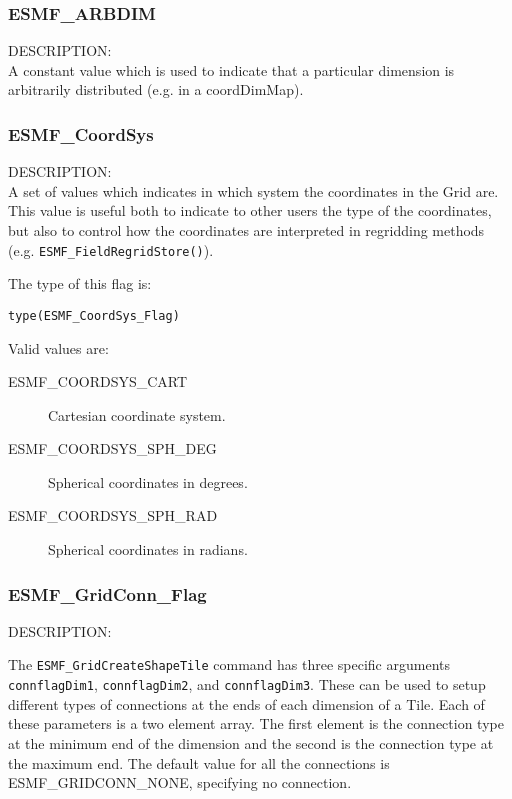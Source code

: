 
\subsubsection{ESMF\_ARBDIM}
\label{sec:opt:arbdim}

{\sf DESCRIPTION:\\}
A constant value which is used to indicate that a particular dimension is arbitrarily distributed (e.g. in a coordDimMap). 

\subsubsection{ESMF\_CoordSys}
\label{sec:opt:coordsys}

{\sf DESCRIPTION:\\}
 A set of values which indicates in which system the coordinates in the Grid are. This value is useful both to indicate to 
other users the type of the coordinates, but also to control how the coordinates are interpreted in regridding methods 
(e.g. {\tt ESMF\_FieldRegridStore()}).

The type of this flag is:

{\tt type(ESMF\_CoordSys\_Flag)}

Valid values are:
\begin{description}
\item [ESMF\_COORDSYS\_CART] Cartesian coordinate system. 

\item [ESMF\_COORDSYS\_SPH\_DEG] Spherical coordinates in degrees.

\item [ESMF\_COORDSYS\_SPH\_RAD] Spherical coordinates in radians.
\end{description}


\subsubsection{ESMF\_GridConn\_Flag}
\label{sec:opt:gridconn}

{\sf DESCRIPTION:\\}
\begin{sloppypar}
The {\tt ESMF\_GridCreateShapeTile} command has three specific arguments
{\tt connflagDim1}, {\tt connflagDim2}, and {\tt connflagDim3}. These can be used
to setup different types of connections at the ends of each dimension
of a Tile.  Each of these parameters is a two element array. The first
element is the connection type at the minimum end of the dimension
and the second is the connection type at the maximum end. The default
value for all the connections is ESMF\_GRIDCONN\_NONE, specifying no
connection.
\end{sloppypar}

